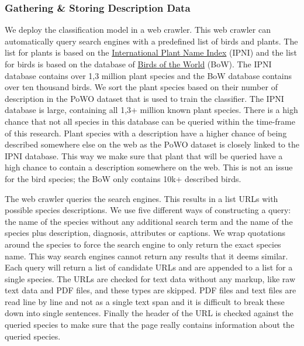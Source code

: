 \documentclass[a4paper, 12pt, oneside]{book} %
\begin{document}
\subsubsection{Gathering \& Storing Description Data}
We deploy the classification model in a web crawler.
This web crawler can automatically query search engines with a predefined list of birds and plants.
The list for plants is based on the \href{https://www.ipni.org/}{International Plant Name Index} (IPNI) and the list for birds is based on the database of \href{https://birdsoftheworld.org/bow/home}{Birds of the World} (BoW).
The IPNI database contains over 1,3 million plant species and the BoW database contains over ten thousand birds.
We sort the plant species based on their number of description in the PoWO dataset that is used to train the classifier.
The IPNI database is large, containing all 1,3+ million known plant species.
There is a high chance that not all species in this database can be queried within the time-frame of this research.
Plant species with a description have a higher chance of being described somewhere else on the web as the PoWO dataset is closely linked to the IPNI database.
This way we make sure that plant that will be queried have a high chance to contain a description somewhere on the web.
This is not an issue for the bird species; the BoW only contains 10k+ described birds.

The web crawler queries the search engines. 
This results in a list URLs with possible species descriptions.
We use five different ways of constructing a query: the name of the species without any additional search term and the name of the species plus description, diagnosis, attributes or captions.
We wrap quotations around the species to force the search engine to only return the exact species name. 
This way search engines cannot return any results that it deems similar.
Each query will return a list of candidate URLs and are appended to a list for a single species.
The URLs are checked for text data without any markup, like raw text data and PDF files, and these types are skipped.
PDF files and text files are read line by line and not as a single text span and it is difficult to break these down into single sentences. 
Finally the header of the URL is checked against the queried species to make sure that the page really contains information about the queried species.
\end{document}
